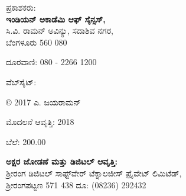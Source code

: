 

ಪ್ರಕಾಶಕರು:\\\textbf{ಇಂಡಿಯನ್ ಅಕಾಡೆಮಿ ಆಫ್ ಸೈನ್ಸಸ್,}\\
 ಸಿ.ವಿ. ರಾಮನ್ ಅವಿನ್ಯು, ಸದಾಶಿವ ನಗರ,\\
 ಬೆಂಗಳೂರು 560 080

ದೂರವಾಣಿ: 080 - 2266 1200

ವೆಬ್‍ಸೈಟ್: 

© 2017 ಎ. ಜಯರಾಮನ್

ಮೊದಲನೆ ಆವೃತ್ತಿ: 2018

ಬೆಲೆ: 200.00

 \textbf{ಅಕ್ಷರ ಜೋಡಣೆ ಮತ್ತು ಡಿಜಿಟಲ್ ಆವೃತ್ತಿ:}\\
 ಶ‍್ರೀರಂಗ ಡಿಜಿಟಲ್ ಸಾಫ್ಟ್‌ವೇರ್ ಟೆಕ್ನಾಲಜೀಸ್ ಪ್ರೈವೇಟ್ ಲಿಮಿಟೆಡ್,\\
 ಶ‍್ರೀರಂಗಪಟ್ಟಣ 571 438 ದೂ: (08236) 292432

